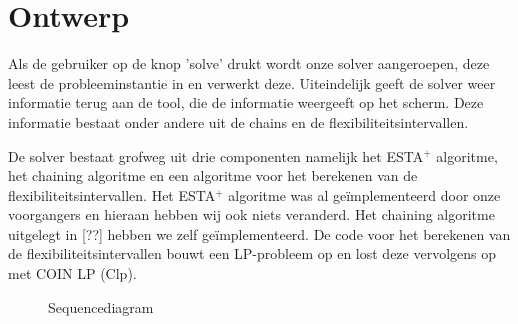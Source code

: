 \section{Ontwerp}
Als de gebruiker op de knop 'solve' drukt wordt onze solver aangeroepen, deze leest de probleeminstantie in en verwerkt deze. Uiteindelijk geeft de solver weer informatie terug aan de tool, die de informatie weergeeft op het scherm. Deze informatie bestaat onder andere uit de chains en de flexibiliteitsintervallen.

De solver bestaat grofweg uit drie componenten namelijk het ESTA$^+$ algoritme, het chaining algoritme en een algoritme voor het berekenen van de flexibiliteitsintervallen. Het ESTA$^+$ algoritme was al ge\"implementeerd door onze voorgangers en hieraan hebben wij ook niets veranderd. Het chaining algoritme uitgelegt in [??] hebben we zelf ge\"implementeerd. De code voor het berekenen van de flexibiliteitsintervallen bouwt een LP-probleem op en lost deze vervolgens op met COIN LP (Clp). 

\newpage
\begin{figure}[H]
\centering
\label{fig:sd}

\caption{Sequencediagram} 
\end{figure}
